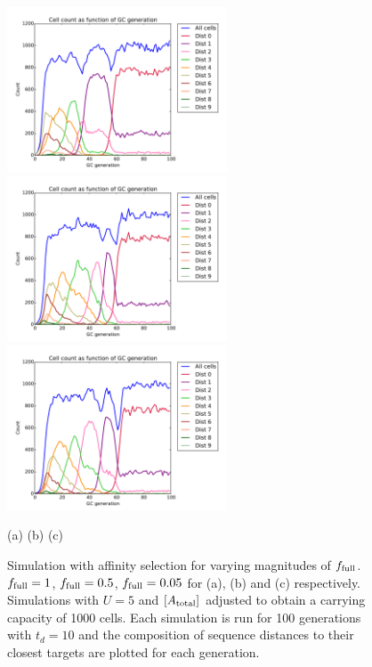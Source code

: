 \begin{figure}[!ht]
\begin{center} 
\includegraphics[height=49mm]{figures/f_full_1.pdf}
\includegraphics[height=49mm]{figures/f_full_05.pdf}
\includegraphics[height=49mm]{figures/f_full_005.pdf} \newline%
\end{center}
\vspace{-8mm} \hspace{23mm} (a) \hspace{37mm} (b) \hspace{37mm} (c)
    \caption{
        \label{fig:no_effect_of_f_full}
        Simulation with affinity selection for varying magnitudes of $f_{\text{full}}$.
        $f_{\text{full}}=1$, $f_{\text{full}}=0.5$, $f_{\text{full}}=0.05$ for (a), (b) and (c) respectively. Simulations with $U=5$ and $[A_{\text{total}}]$ adjusted to obtain a carrying capacity of 1000 cells. Each simulation is run for 100 generations with $t_d=10$ and the composition of sequence distances to their closest targets are plotted for each generation.
        }
\end{figure}

